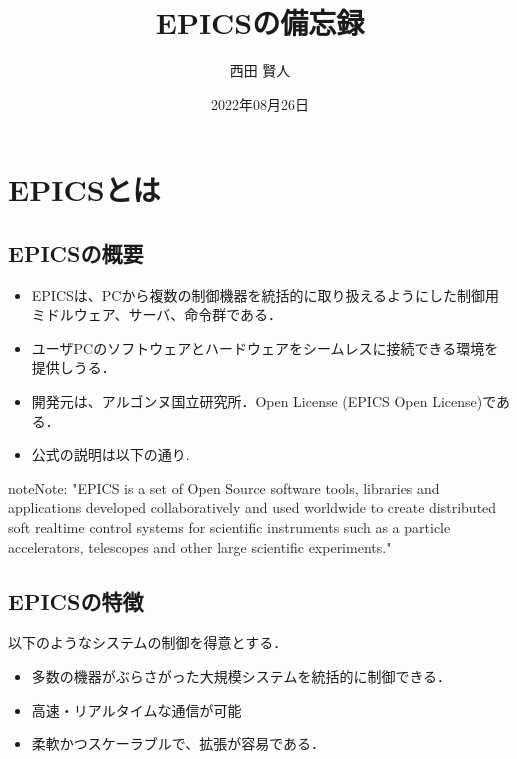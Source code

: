 \documentclass[letterpaper,10pt,dvipdfmx]{sphinxmanual}
\title{EPICSの備忘録}
\date{2022年08月26日}
\author{西田 賢人}
\begin{document}
\pagestyle{empty}
\sphinxmaketitle
\pagestyle{plain}
\sphinxtableofcontents
\pagestyle{normal}
\label{\detokenize{index::doc}}



\chapter{EPICSとは}
\label{\detokenize{epics/rst/epics_index:epics}}\label{\detokenize{epics/rst/epics_index::doc}}

\section{EPICSの概要}
\label{\detokenize{epics/rst/epics_index:id1}}\begin{itemize}
\item {} 
EPICSは、PCから複数の制御機器を統括的に取り扱えるようにした制御用ミドルウェア、サーバ、命令群である．

\item {} 
ユーザPCのソフトウェアとハードウェアをシームレスに接続できる環境を提供しうる．

\item {} 
開発元は、アルゴンヌ国立研究所．Open License (EPICS Open License)である．

\item {} 
公式の説明は以下の通り.

\end{itemize}

\begin{sphinxadmonition}{note}{Note:}
"EPICS is a set of Open Source software tools, libraries and applications developed collaboratively and used worldwide to create distributed soft real\sphinxhyphen{}time control systems for scientific instruments such as a particle accelerators, telescopes and other large scientific experiments."
\end{sphinxadmonition}


\section{EPICSの特徴}
\label{\detokenize{epics/rst/epics_index:id2}}
以下のようなシステムの制御を得意とする．
\begin{itemize}
\item {} 
多数の機器がぶらさがった大規模システムを統括的に制御できる．

\item {} 
高速・リアルタイムな通信が可能

\item {} 
柔軟かつスケーラブルで、拡張が容易である．

\end{itemize}
\end{document}

